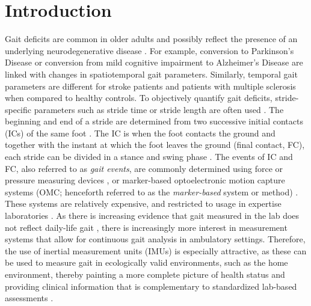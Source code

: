 \documentclass[sensors,article,submit,pdftex,moreauthors]{Definitions/mdpi}
\begin{document}
\section{Introduction}
Gait deficits are common in older adults and possibly reflect the presence of an underlying neurodegenerative disease \cite{Snijders2007,Hodgins2008}. For example, conversion to Parkinson's Disease \cite{DelDin2019} or conversion from mild cognitive impairment to Alzheimer's Disease \cite{Koenig2017,Bertoli2018} are linked with changes in spatiotemporal gait parameters. Similarly, temporal gait parameters are different for stroke patients \cite{SchroederVon1995,Mohan2021} and patients with multiple sclerosis \cite{Griskevicius2016,Flachenecker2019} when compared to healthy controls. To objectively quantify gait deficits, stride-specific parameters such as stride time or stride length are often used \cite{Hannink2016}. The beginning and end of a stride are determined from two successive initial contacts (ICs) of the same foot \cite{Perry2010,Whittle2012}. The IC is when the foot contacts the ground and together with the instant at which the foot leaves the ground (final contact, FC), each stride can be divided in a stance and swing phase \cite{Rueterbories2010,Bruening2014}.  The events of IC and FC, also referred to as \emph{gait events}, are commonly determined using force or pressure measuring devices \cite{Bruening2014}, or marker-based optoelectronic motion capture systems (OMC; henceforth referred to as the \emph{marker-based} system or method) \cite{Chiari2005,Topley2020}. These systems are relatively expensive, and restricted to usage in expertise laboratories \cite{Iosa2016,Jarchi2018}. As there is increasing evidence that gait measured in the lab does not reflect daily-life gait \cite{Hillel2019,Warmerdam2020,Atrsaei2021}, there is increasingly more interest in measurement systems that allow for continuous gait analysis in ambulatory settings. Therefore, the use of inertial measurement units (IMUs) is especially attractive, as these can be used to measure gait in ecologically valid environments, such as the home environment, thereby painting a more complete picture of health status \cite{DelDin2016,Shah2020} and providing clinical information that is complementary to standardized lab-based assessments \cite{Warmerdam2020,Fasano2020,Atrsaei2021,Corra2021}.
\end{document}

